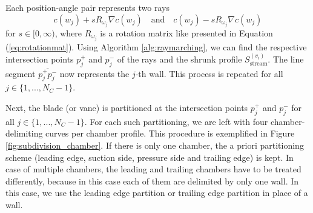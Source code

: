 \documentclass[a4paper, 11pt]{report}
\theoremstyle{definition}
\begin{document}
	Each position-angle pair represents two rays
		$$ c(w_j) + sR_{\omega_j} \nabla c(w_j) \quad\text{and}\quad c(w_j) - sR_{\omega_j} \nabla c(w_j) $$
	for $s \in [0, \infty)$, where $R_{\omega_j}$ is a rotation matrix like presented in Equation (\ref{eq:rotationmat}). Using Algorithm \ref{alg:raymarching}, we can find the respective intersection points $p_j^+$ and $p_j^-$ of the rays and the shrunk profile $S^{(v_i)}_\textrm{stream}$. The line segment $\overline{p_j^+p_j^-}$ now represents the $j$-th wall. This process is repeated for all $j \in \{1,...,N_C-1\}$.

	Next, the blade (or vane) is partitioned at the intersection points $p_j^+$ and $p_j^-$ for all $j \in \{1,...,N_C-1\}$. For each such partitioning, we are left with four chamber-delimiting curves per chamber profile. This procedure is exemplified in Figure \ref{fig:subdivision_chamber}. If there is only one chamber, the a priori partitioning scheme (leading edge, suction side, pressure side and trailing edge) is kept. In case of multiple chambers, the leading and trailing chambers have to be treated differently, because in this case each of them are delimited by only one wall. In this case, we use the leading edge partition or trailing edge partition in place of a wall.
\end{document}
